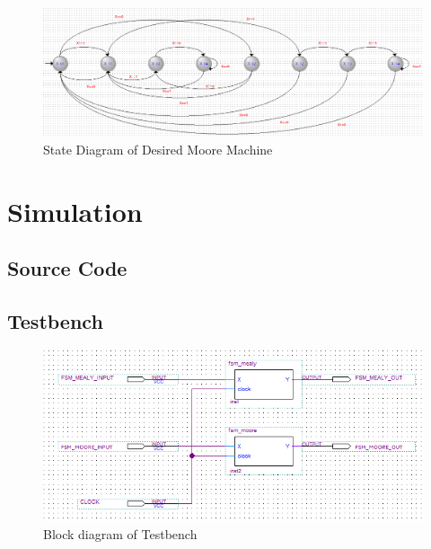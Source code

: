 \documentclass{report}
\begin{document}
        \begin{figure}[!htb]
            \centering
            \includegraphics[width=\textwidth]{diagrams/moore_statediagram.PNG}
            \caption{State Diagram of Desired Moore Machine}
        \end{figure}

    \chapter{Simulation}
        \section{Source Code}
            
            
            
        \section{Testbench}
            \begin{figure}[!htb]
                \centering
                \includegraphics[width=\textwidth]{diagrams/block_diagram.PNG}
                \caption {Block diagram of Testbench}
                \label{fig:wf-0}
            \end{figure}
            
\end{document}
